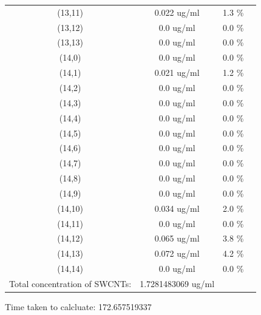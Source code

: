 \documentclass{article}
\begin{document}
\begin{tabular}{c c c c}
(13,11)&        0.022 ug/ml        &1.3 \%\\
(13,12)&        0.0 ug/ml        &0.0 \%\\
(13,13)&        0.0 ug/ml        &0.0 \%\\
(14,0)&        0.0 ug/ml        &0.0 \%\\
(14,1)&        0.021 ug/ml        &1.2 \%\\
(14,2)&        0.0 ug/ml        &0.0 \%\\
(14,3)&        0.0 ug/ml        &0.0 \%\\
(14,4)&        0.0 ug/ml        &0.0 \%\\
(14,5)&        0.0 ug/ml        &0.0 \%\\
(14,6)&        0.0 ug/ml        &0.0 \%\\
(14,7)&        0.0 ug/ml        &0.0 \%\\
(14,8)&        0.0 ug/ml        &0.0 \%\\
(14,9)&        0.0 ug/ml        &0.0 \%\\
(14,10)&        0.034 ug/ml        &2.0 \%\\
(14,11)&        0.0 ug/ml        &0.0 \%\\
(14,12)&        0.065 ug/ml        &3.8 \%\\
(14,13)&        0.072 ug/ml        &4.2 \%\\
(14,14)&        0.0 ug/ml        &0.0 \%\\
Total concentration of SWCNTs: &1.7281483069 ug/ml\\

\end{tabular}Time taken to calcluate: 172.657519337
\end{document}

